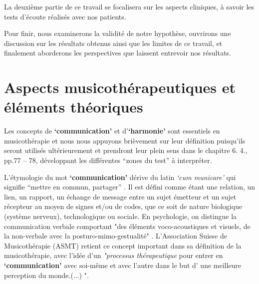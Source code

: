 La deuxième partie de ce travail se focalisera sur les aspects
cliniques, à savoir les tests d'écoute réalisés  avec  nos patients.

Pour finir, nous examinerons la validité de notre hypothèse, ouvrirons
une discussion sur les résultats obtenus ainsi que les limites de ce
travail, et finalement aborderons les perspectives que
laissent entrevoir nos résultats.



\section{{Aspects musicothérapeutiques et éléments théoriques}}






Les concepts de \textbf{`communication'} et  d'\textbf{`harmonie'}
sont essentiels en
musicothérapie et nous nous appuyons brièvement
sur leur définition puisqu'ils seront utilisés ultérieurement  et prendront leur plein sens
dans le chapitre 6. 4., pp.77 -- 78, développant les différentes ``zones du test'' à interpréter.


L'étymologie du mot  \textbf{`communication'} dérive du latin  \textit{`cum
  municare'} qui signifie ``mettre en commun, partager'' \autocite{dicpetitrobert}.
Il est défini comme étant une
relation, un lien, un rapport, un échange de message entre un sujet émetteur et un
sujet récepteur au moyen de signes et/ou de codes, que ce soit de nature biologique (système nerveux), technologique ou sociale. En psychologie, on distingue la communication verbale comportant "des éléments voco-acoustiques et visuels, de la non-verbale avec la posturo-mimo-gestualité" \autocite{doronparot}.
L'Association Suisse
de Musicothérapie (ASMT) retient ce concept important dans sa définition de la musicothérapie, avec l'idée  d'un\textit{ "processus thérapeutique }pour entrer en \textbf{`communication'} avec soi-même et avec
l'autre dans le but d' une meilleure perception du
monde.(...) "\autocite{site_musitherapy}.


